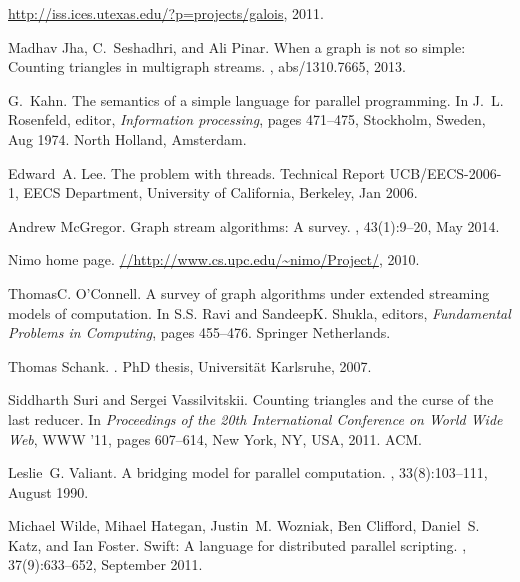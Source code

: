 \documentclass{article}                     \usepackage{graphics}
\begin{document}
\begin{thebibliography}{10}
\url{http://iss.ices.utexas.edu/?p=projects/galois}, 2011.

Madhav Jha, C.~Seshadhri, and Ali Pinar.
\newblock When a graph is not so simple: Counting triangles in multigraph
  streams.
, abs/1310.7665, 2013.

G.~Kahn.
\newblock The semantics of a simple language for parallel programming.
\newblock In J.~L. Rosenfeld, editor, {\em Information processing}, pages
  471--475, Stockholm, Sweden, Aug 1974. North Holland, Amsterdam.

Edward~A. Lee.
\newblock The problem with threads.
\newblock Technical Report UCB/EECS-2006-1, EECS Department, University of
  California, Berkeley, Jan 2006.

Andrew McGregor.
\newblock Graph stream algorithms: A survey.
, 43(1):9--20, May 2014.

Nimo home page.
\newblock \url{//http://www.cs.upc.edu/~nimo/Project/}, 2010.

ThomasC. O’Connell.
\newblock A survey of graph algorithms under extended streaming models of
  computation.
\newblock In S.S. Ravi and SandeepK. Shukla, editors, {\em Fundamental Problems
  in Computing}, pages 455--476. Springer Netherlands.

Thomas Schank.
.
\newblock PhD thesis, Universit\"{a}t Karlsruhe, 2007.

Siddharth Suri and Sergei Vassilvitskii.
\newblock Counting triangles and the curse of the last reducer.
\newblock In {\em Proceedings of the 20th International Conference on World
  Wide Web}, WWW '11, pages 607--614, New York, NY, USA, 2011. ACM.

Leslie~G. Valiant.
\newblock A bridging model for parallel computation.
, 33(8):103--111, August 1990.

Michael Wilde, Mihael Hategan, Justin~M. Wozniak, Ben Clifford, Daniel~S. Katz,
  and Ian Foster.
\newblock Swift: A language for distributed parallel scripting.
, 37(9):633--652, September 2011.

\end{thebibliography}
\end{document}
